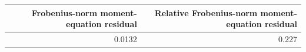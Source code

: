 \begin{tabular}{rr}
\toprule
Frobenius-norm moment-equation residual & Relative Frobenius-norm moment-equation residual \\
\midrule
0.0132 & 0.227 \\
\bottomrule
\end{tabular}
